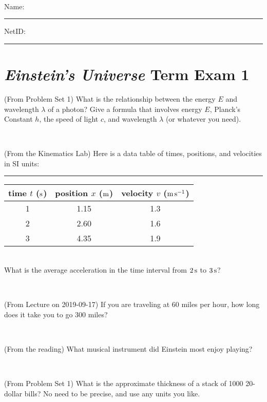 \documentclass[12pt, letterpaper]{article}
\begin{document}
\vfill ~


\cleardoublepage



\noindent
Name: \rule[-1ex]{0.60\textwidth}{0.1pt}
NetID: \rule[-1ex]{0.20\textwidth}{0.1pt}

\section*{\textsl{Einstein's Universe} Term Exam 1}
\setcounter{problem}{1}


\begin{problem} (From Problem Set 1)
What is the relationship between the energy $E$ and wavelength
$\lambda$ of a photon? Give a formula that involves energy $E$,
Planck's Constant $h$, the speed of light $c$, and wavelength
$\lambda$ (or whatever you need).
\end{problem}

\vfill ~

\begin{problem} (From the Kinematics Lab)
Here is a data table of times, positions, and velocities in SI units:\\
\rule{1.0in}{0pt}\begin{tabular}{c|c|c}
time $t$ ($\mathrm{s}$) & position $x$ ($\mathrm{m}$) & velocity $v$ ($\mathrm{m}\,\mathrm{s}^{-1}$) \\
\hline
1 & 1.15 & 1.3 \\
2 & 2.60 & 1.6 \\
3 & 4.35 & 1.9 \\
\hline
\end{tabular}\\
What is the average acceleration in the time interval from $2\,\mathrm{s}$ to $3\,\mathrm{s}$?
\end{problem}


\vfill ~

\begin{problem} (From Lecture on 2019-09-17)
If you are traveling at 60 miles per hour, how long does
it take you to go 300 miles?
\end{problem}


\vfill ~

\begin{problem} (From the reading)
What musical instrument did Einstein most enjoy playing?
\end{problem}


\vfill ~


\clearpage


\begin{problem} (From Problem Set 1)
What is the approximate thickness of a stack of 1000 20-dollar bills?
No need to be precise, and use any units you like.
\end{problem}
\end{document}
